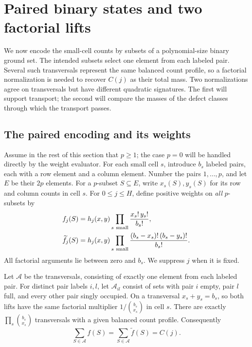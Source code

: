 \section{Paired binary states and two factorial lifts}
\label{sec:signatures}

We now encode the small-cell counts by subsets of a polynomial-size
binary ground set.  The intended subsets select one
element from each labeled pair.  Several such transversals represent
the same balanced count profile, so a factorial normalization is needed
to recover $C(j)$ as their total mass.  Two normalizations agree on transversals but have
different quadratic signatures.  The first will support transport;
the second will compare the masses of the defect classes through
which the transport passes.

\subsection{The paired encoding and its weights}

Assume in the rest of this section that \(p\ge1\); the case \(p=0\)
will be handled directly by the weight evaluator.
For each small cell \(s\), introduce \(b_s\) labeled pairs, each
with a row element and a column element.
Number the pairs \(1,\ldots,p\), and let \(E\) be their \(2p\)
elements.
For a \(p\)-subset \(S\subseteq E\), write \(x_s(S),y_s(S)\) for
its row and column counts in cell \(s\).
For \(0\le j\le H\), define positive weights on \emph{all}
\(p\)-subsets by
\begin{align}
 f_j(S)
 &=h_j(x,y)\prod_{s\ \mathrm{small}}\frac{x_s!\,y_s!}{b_s!},
 \notag\\
 \widetilde f_j(S)
 &=h_j(x,y)\prod_{s\ \mathrm{small}}
       \frac{(b_s-x_s)!\,(b_s-y_s)!}{b_s!}.
 \label{eq:lifts}
\end{align}
All factorial arguments lie between zero and \(b_s\).
We suppress \(j\) when it is fixed.

Let \(\mathcal A\) be the transversals, consisting of exactly one
element from each labeled pair.
For distinct pair labels \(i,l\), let \(\mathcal A_{il}\) consist
of sets with pair \(i\) empty, pair \(l\) full, and every other
pair singly occupied.
On a transversal \(x_s+y_s=b_s\), so both lifts have the same
factorial multiplier \(1/\binom{b_s}{x_s}\) in cell \(s\).
There are exactly \(\prod_s\binom{b_s}{x_s}\) transversals with a
given balanced count profile.
Consequently
\begin{equation}
 \sum_{S\in\mathcal A}f(S)
 =\sum_{S\in\mathcal A}\widetilde f(S)
 =C(j).
 \label{eq:transversal-mass}
\end{equation}

